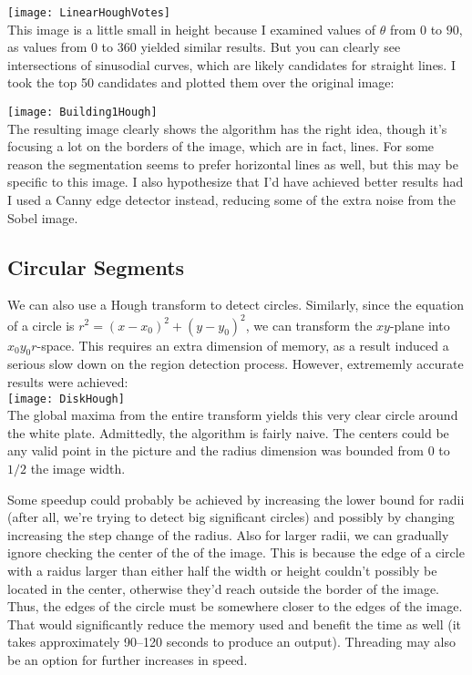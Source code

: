 \documentclass[12pt]{article}
\begin{document}
\texttt{[image: LinearHoughVotes]}\\

This image is a little small in height because I examined values of $\theta$
from $0$ to $90$, as values from $0$ to $360$ yielded similar results. But you
can clearly see intersections of sinusodial curves, which are likely candidates
for straight lines. I took the top 50 candidates and plotted them over the
original image:

\texttt{[image: Building1Hough]}\\

The resulting image clearly shows the algorithm has the right idea, though it's
focusing a lot on the borders of the image, which are in fact, lines. For some
reason the segmentation seems to prefer horizontal lines as well, but this may
be specific to this image. I also hypothesize that I'd have achieved better
results had I used a Canny edge detector instead, reducing some of the extra
noise from the Sobel image.

\subsection{Circular Segments}

We can also use a Hough transform to detect circles. Similarly, since the
equation of a circle is $r^2 = {(x - x_0)}^2 + {(y - y_0)}^2$, we can transform the
$xy$-plane into $x_0y_0r$-space. This requires an extra dimension of memory, as
a result induced a serious slow down on the region detection process. However,
extrememly accurate results were achieved:\\

\texttt{[image: DiskHough]}\\

The global maxima from the entire transform yields this very clear circle around
the white plate. Admittedly, the algorithm is fairly naive. The centers could be
any valid point in the picture and the radius dimension was bounded from $0$ to
$1/2$ the image width.

Some speedup could probably be achieved by increasing the
lower bound for radii (after all, we're trying to detect big significant
circles) and possibly by changing increasing the step change of the radius. Also
for larger radii, we can gradually ignore checking the center of the
of the image. This is because the edge of a circle with a raidus larger than either half
the width or height couldn't possibly be located in the center, otherwise they'd reach
outside the border of the image. Thus, the edges of the circle must be somewhere
closer to the edges of the image. That would significantly reduce the memory
used and benefit the time as well (it takes approximately 90--120 seconds to
produce an output). Threading may also be an option for further increases in speed.
\end{document}
